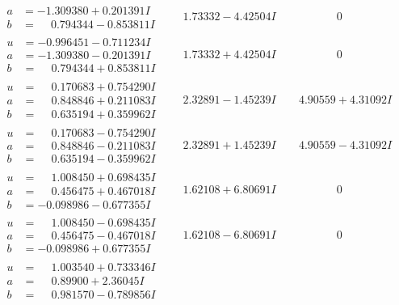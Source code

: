 \documentclass[1p]{elsarticle_modified}
\theoremstyle{definition}
\begin{document}
$$\begin{array}{c|c|c}
\begin{aligned}
a &= -1.309380 + 0.201391 I \\
b &= \phantom{-}0.794344 - 0.853811 I\end{aligned}
 & \phantom{-}1.73332 - 4.42504 I & \phantom{-0.000000 } 0 \\ \hline\begin{aligned}
u &= -0.996451 - 0.711234 I \\
a &= -1.309380 - 0.201391 I \\
b &= \phantom{-}0.794344 + 0.853811 I\end{aligned}
 & \phantom{-}1.73332 + 4.42504 I & \phantom{-0.000000 } 0 \\ \hline\begin{aligned}
u &= \phantom{-}0.170683 + 0.754290 I \\
a &= \phantom{-}0.848846 + 0.211083 I \\
b &= \phantom{-}0.635194 + 0.359962 I\end{aligned}
 & \phantom{-}2.32891 - 1.45239 I & \phantom{-}4.90559 + 4.31092 I \\ \hline\begin{aligned}
u &= \phantom{-}0.170683 - 0.754290 I \\
a &= \phantom{-}0.848846 - 0.211083 I \\
b &= \phantom{-}0.635194 - 0.359962 I\end{aligned}
 & \phantom{-}2.32891 + 1.45239 I & \phantom{-}4.90559 - 4.31092 I \\ \hline\begin{aligned}
u &= \phantom{-}1.008450 + 0.698435 I \\
a &= \phantom{-}0.456475 + 0.467018 I \\
b &= -0.098986 - 0.677355 I\end{aligned}
 & \phantom{-}1.62108 + 6.80691 I & \phantom{-0.000000 } 0 \\ \hline\begin{aligned}
u &= \phantom{-}1.008450 - 0.698435 I \\
a &= \phantom{-}0.456475 - 0.467018 I \\
b &= -0.098986 + 0.677355 I\end{aligned}
 & \phantom{-}1.62108 - 6.80691 I & \phantom{-0.000000 } 0 \\ \hline\begin{aligned}
u &= \phantom{-}1.003540 + 0.733346 I \\
a &= \phantom{-}0.89900 + 2.36045 I \\
b &= \phantom{-}0.981570 - 0.789856 I\end{aligned}

\end{array}$$
\end{document}

